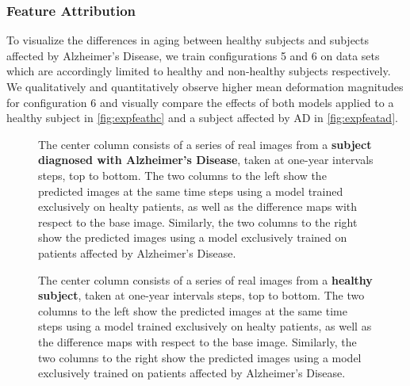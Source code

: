 \subsubsection*{Feature Attribution}
To visualize the differences in aging between healthy subjects and subjects affected by Alzheimer's Disease, we train configurations 5 and 6 on data sets which are accordingly limited to healthy and non-healthy subjects respectively. We qualitatively and quantitatively observe higher mean deformation magnitudes for configuration 6 and visually compare the effects of both models applied to a healthy subject in \autoref{fig:expfeathc} and a subject affected by AD in \autoref{fig:expfeatad}.

\begin{figure}[h]
	\centering
	
	\vspace{-15pt}
	\caption{The center column consists of a series of real images from a \textbf{subject diagnosed with Alzheimer's Disease}, taken at one-year intervals steps, top to bottom. The two columns to the left show the predicted images at the same time steps using a model trained exclusively on healty patients, as well as the difference maps with respect to the base image. Similarly, the two columns to the right show the predicted images using a model exclusively trained on patients affected by Alzheimer's Disease.}
	\label{fig:expfeatad}
\end{figure}

\begin{figure}[h]
	\centering
	
	\vspace{-15pt}
	\caption{The center column consists of a series of real images from a \textbf{healthy subject}, taken at one-year intervals steps, top to bottom. The two columns to the left show the predicted images at the same time steps using a model trained exclusively on healty patients, as well as the difference maps with respect to the base image. Similarly, the two columns to the right show the predicted images using a model exclusively trained on patients affected by Alzheimer's Disease.}
	\label{fig:expfeathc}
\end{figure}



